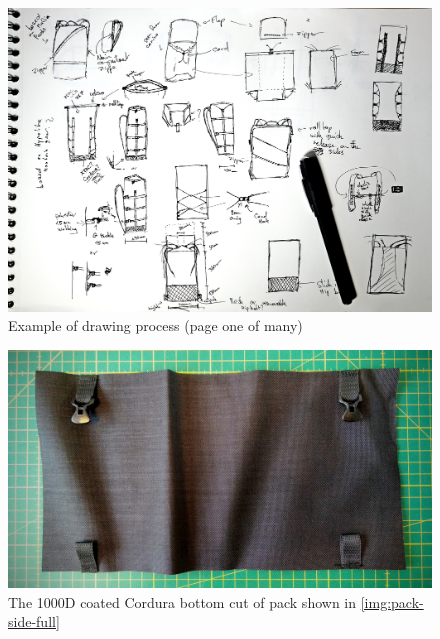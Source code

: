\begin{figure}[h]
  \includegraphics[width=\textwidth]{media/images/design-drawings}
  \caption{Example of drawing process (page one of many)}
  \label{img:design-drawings}
\end{figure}

\begin{figure}[h]
  \includegraphics[width=\textwidth]{media/images/pack-bottom-cut}
  \caption{The 1000D coated Cordura bottom cut of pack shown in \ref{img:pack-side-full}}
  \label{img:pack-bottom-cut}
\end{figure}
